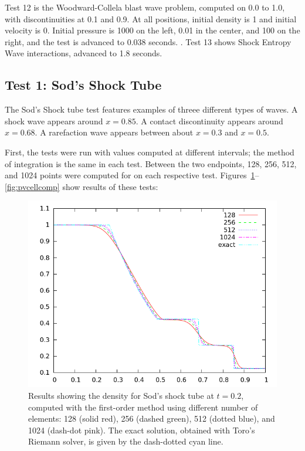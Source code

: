 \documentclass[10pt]{article}
\begin{document}
Test 12 is the Woodward-Collela blast wave problem, computed on 0.0 to 1.0, with discontinuities at 0.1 and 0.9. At all positions, initial density is 1 and initial velocity is 0. Initial pressure is 1000 on the left, 0.01 in the center, and 100 on the right, and the test is advanced to 0.038 seconds. \citep{LiskaWendroff2003}. Test 13 shows Shock Entropy Wave interactions, advanced to 1.8 seconds.
\subsection{Test 1: Sod's Shock Tube} 
The Sod's Shock tube test features examples of threee different types of waves. A shock wave appears around $x=0.85$. A contact discontinuity appears around $x=0.68$. A rarefaction wave appears between about $x=0.3$ and $x=0.5$. 

First, the tests were run with values computed at different intervals; the method of integration is the same in each test. Between the two endpoints, 128, 256, 512, and 1024 points were computed for on each respective test. Figures~\ref{fig:dencellcomp_20}--\ref{fig:pvcellcomp} show results of these tests:
\begin{figure}[h!]
  \begin{center}
    \includegraphics[width=.95\textwidth]{dencellcomp_20}
  \end{center}
  \caption{Results showing the density for Sod's shock tube at $t=0.2$, computed with the first-order method using different number of elements: 128 (solid red), 256 (dashed green), 512 (dotted blue), and 1024 (dash-dot pink).  The exact solution, obtained with Toro's Riemann solver, is given by the dash-dotted cyan line.}
  \label{fig:dencellcomp_20}
\end{figure}
\end{document}
